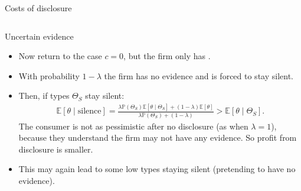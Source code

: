 \documentclass[english,10pt
,aspectratio=169
]{beamer}
\begin{document}
\begin{frame}{Costs of disclosure \citep{verrecchia_discretionary_1983}}
\begin{columns}
\begin{column}{0.4\linewidth}
	\end{column}
\end{columns}
\end{frame}


\begin{frame}{Uncertain evidence \citep{dye_disclosure_1985,jung_disclosure_1988}}
\begin{itemize}
	\item Now return to the case $c=0$, but the firm only has .
	\item With probability $1-\lambda$ the firm has no evidence and is forced to stay silent.
	\item Then, if types $\Theta_S$ stay silent:
	\begin{align*}
		\mathbb{E}[\theta \mid \text{silence}] = \frac{\lambda \mathbb{P}(\Theta_S) \mathbb{E}[\theta \mid \Theta_S] + (1-\lambda) \mathbb{E}[\theta]}{\lambda \mathbb{P}(\Theta_S) + (1-\lambda)} > \mathbb{E}[\theta \mid \Theta_S].
	\end{align*}
	The consumer is not as pessimistic after no disclosure (as when $\lambda=1$), because they understand the firm may not have any evidence. So profit from disclosure is smaller.
	\item This may again lead to some low types staying silent (pretending to have no evidence).
\end{itemize}
\end{frame}
\end{document}
